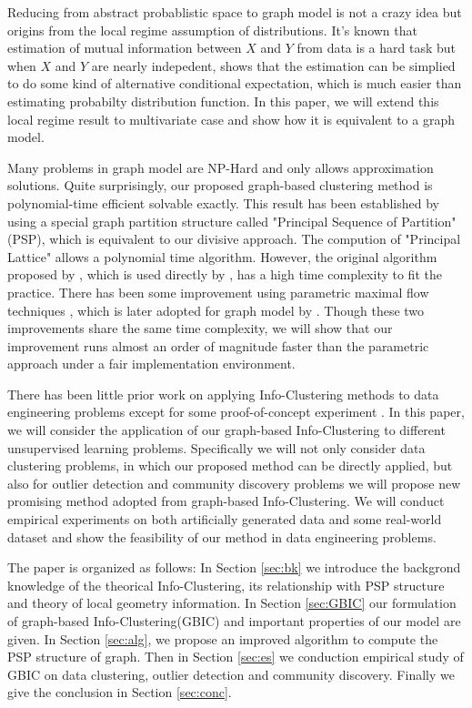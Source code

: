 Reducing from abstract probablistic space to graph model is not a crazy idea but origins from the local regime assumption of distributions. It's known that estimation of mutual information between $X$ and $Y$ from data is a hard task but when $X$ and $Y$ are nearly indepedent, \citet{huang2017information} shows that the estimation can be simplied to do some kind of alternative conditional expectation, which is much easier
than estimating probabilty distribution function. In this paper, we will extend this local regime result to multivariate case and show how it is equivalent to a graph model.

Many problems in graph model are NP-Hard and only allows approximation solutions. Quite surprisingly, our proposed graph-based clustering method is polynomial-time efficient solvable exactly.
This result has been established by using a special graph partition structure called "Principal Sequence of Partition"(PSP), which is equivalent to our divisive approach. The compution of "Principal Lattice" allows a polynomial time algorithm.
However, the original algorithm proposed by
\citet{narayanan}, which is used directly by \citet{mac}, has a high time complexity to fit the practice. There has been some improvement
using parametric maximal flow techniques \citep{kolmogorov}, which is later adopted for graph model
by \citet{pin}. Though these two improvements share the same time complexity, we will show that our improvement runs almost an order of magnitude faster than the parametric approach under a fair implementation environment.

There has been little prior work on applying Info-Clustering methods to data engineering problems except for some proof-of-concept experiment \citep{mac}. In this paper, we will consider the application
of our graph-based Info-Clustering to different unsupervised learning problems. Specifically
we will not only consider data clustering problems, in which our proposed method can be directly applied, but also for outlier detection and community discovery problems we will propose new promising
method adopted from graph-based Info-Clustering. We will conduct empirical experiments on both artificially generated data and some real-world dataset and show the feasibility of our method in
data engineering problems.

The paper is organized as follows: In Section \ref{sec:bk} we introduce the backgrond knowledge of the theorical Info-Clustering, its relationship with PSP structure and theory of local geometry information. In Section \ref{sec:GBIC} our formulation of graph-based Info-Clustering(GBIC) and important properties of our model are given. In Section \ref{sec:alg}, we propose an improved algorithm to compute the PSP structure of graph. Then in Section \ref{sec:es} we conduction empirical study of GBIC on data clustering, outlier detection and community discovery. Finally we give the conclusion in Section \ref{sec:conc}.


